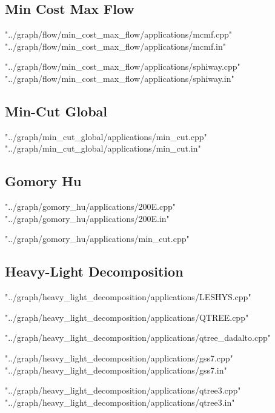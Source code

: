 \documentclass [12pt,onecolumn,oneside]{article}
\begin{document}
\subsection{ Min Cost Max Flow}
 {"../graph/flow/min_cost_max_flow/applications/mcmf.cpp"}
 {"../graph/flow/min_cost_max_flow/applications/mcmf.in"}
\newpage

 {"../graph/flow/min_cost_max_flow/applications/sphiway.cpp"}
 {"../graph/flow/min_cost_max_flow/applications/sphiway.in"}
\newpage

\subsection{ Min-Cut Global}
 {"../graph/min_cut_global/applications/min_cut.cpp"}
 {"../graph/min_cut_global/applications/min_cut.in"}

\subsection{ Gomory Hu}
 {"../graph/gomory_hu/applications/200E.cpp"}
 {"../graph/gomory_hu/applications/200E.in"}
\newpage

 {"../graph/gomory_hu/applications/min_cut.cpp"}

\subsection{ Heavy-Light Decomposition}
 {"../graph/heavy_light_decomposition/applications/LESHYS.cpp"}
\newpage

 {"../graph/heavy_light_decomposition/applications/QTREE.cpp"}
\newpage

 {"../graph/heavy_light_decomposition/applications/qtree_dadalto.cpp"}
\newpage

 {"../graph/heavy_light_decomposition/applications/gss7.cpp"}
 {"../graph/heavy_light_decomposition/applications/gss7.in"}
\newpage

 {"../graph/heavy_light_decomposition/applications/qtree3.cpp"}
 {"../graph/heavy_light_decomposition/applications/qtree3.in"}
\newpage
\end{document}
